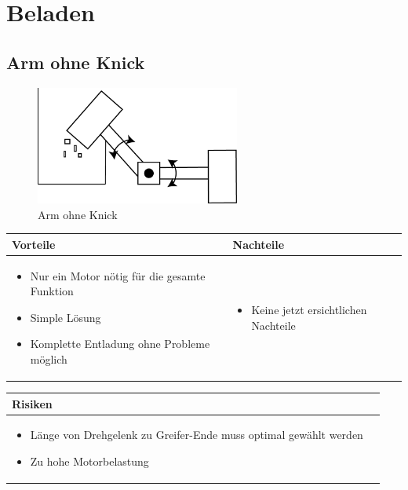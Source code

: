 
\section{Beladen}


\subsection{Arm ohne Knick}
\begin{figure} [hbp]
	\centering
	\includegraphics[width=0.6\textwidth]{fig/Beladen_1.png}
	\caption{Arm ohne Knick}
\end{figure}

\begin{table}[h]
\begin{tabular}{p{} | p{}}


 \textbf{Vorteile} & \textbf{Nachteile} \\ \hline
	 
\begin{itemize}
\item Nur ein Motor nötig für die gesamte Funktion
\item Simple Lösung
\item Komplette Entladung ohne Probleme möglich
\end{itemize}

 
 &
 
\begin{itemize}
\item Keine jetzt ersichtlichen Nachteile
\end{itemize}

\end{tabular}
\end{table}

\begin{table}[h]
\begin{tabular}{p{}p{}}


 \textbf{Risiken} & \\ \hline
	 
\begin{itemize}
\item Länge von Drehgelenk zu Greifer-Ende muss optimal gewählt werden
\item Zu hohe Motorbelastung
\end{itemize}
 
\end{tabular}
\end{table}

